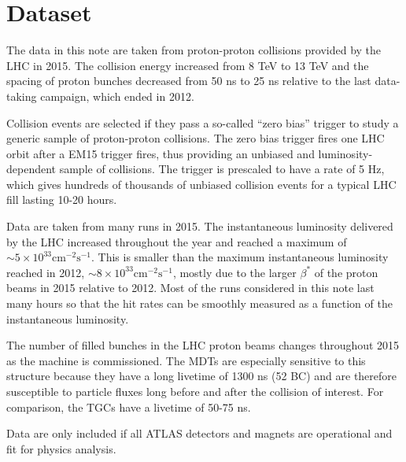 \section{Dataset}
\label{sec:dataset}

The data in this note are taken from proton-proton collisions provided by the LHC in 2015. The collision energy increased from 8 TeV to 13 TeV and the spacing of proton bunches decreased from 50 ns to 25 ns relative to the last data-taking campaign, which ended in 2012.

Collision events are selected if they pass a so-called ``zero bias'' trigger to study a generic sample of proton-proton collisions. The zero bias trigger fires one LHC orbit after a EM15 trigger fires, thus providing an unbiased and luminosity-dependent sample of collisions. The trigger is prescaled to have a rate of 5 Hz, which gives hundreds of thousands of unbiased collision events for a typical LHC fill lasting 10-20 hours.

Data are taken from many runs in 2015. The instantaneous luminosity delivered by the LHC increased throughout the year and reached a maximum of $\sim\!5\times10^{33} \text{cm}^{-2} \text{s}^{-1}$. This is smaller than the maximum instantaneous luminosity reached in 2012, $\sim\!8\times10^{33} \text{cm}^{-2} \text{s}^{-1}$, mostly due to the larger $\beta^\ast$ of the proton beams in 2015 relative to 2012. Most of the runs considered in this note last many hours so that the hit rates can be smoothly measured as a function of the instantaneous luminosity.

The number of filled bunches in the LHC proton beams changes throughout 2015 as the machine is commissioned. The MDTs are especially sensitive to this structure because they have a long livetime of 1300 ns (52 BC) and are therefore susceptible to particle fluxes long before and after the collision of interest. For comparison, the TGCs have a livetime of 50-75 ns.

Data are only included if all ATLAS detectors and magnets are operational and fit for physics analysis.



